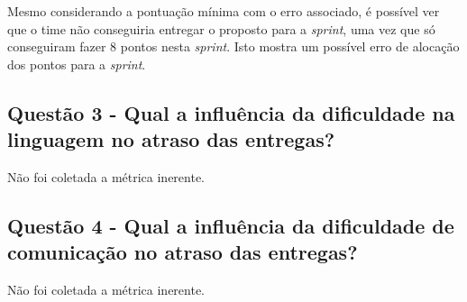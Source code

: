 \begin{apendicesenv}
	      Mesmo considerando a pontuação mínima com o erro associado, é possível ver que o time não
	      conseguiria entregar o proposto para a \textit{sprint}, uma vez que só conseguiram fazer 
	      8 pontos nesta \textit{sprint}. Isto mostra um possível erro de alocação dos pontos para a \textit{sprint}.
	    
	  \subsection{Questão 3 - Qual a influência da dificuldade na linguagem no atraso das entregas?}
	    
	    Não foi coletada a métrica inerente.
	  
	  \subsection{Questão 4 - Qual a influência da dificuldade de comunicação no atraso das entregas?}
	  
	    Não foi coletada a métrica inerente.
	
\end{apendicesenv}
